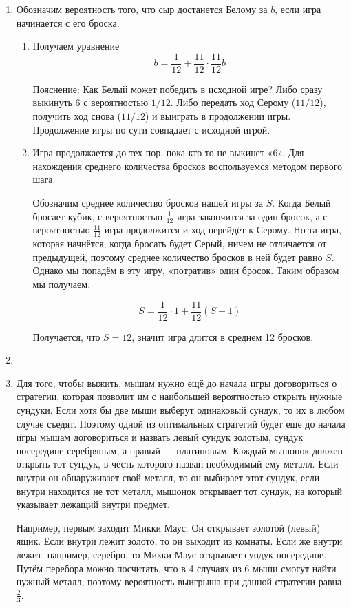 \begin{enumerate}
\item Обозначим вероятность того, что сыр достанется Белому за $b$, если игра
начинается с его броска.

\begin{enumerate}
\item Получаем уравнение
\[
b = \frac{1}{12} + \frac{11}{12} \cdot \frac{11}{12} b
\]

Пояснение: Как Белый может победить в исходной игре? Либо сразу выкинуть 6 с вероятностью $1/12$.
Либо передать ход Серому ($11/12$), получить ход снова ($11/12$) и выиграть в продолжении игры.
Продолжение игры по сути совпадает с исходной игрой.

\item Игра продолжается до тех пор, пока кто-то не выкинет «6».
Для нахождения среднего количества бросков воспользуемся методом первого шага.

Обозначим среднее количество бросков нашей игры за $S$.
Когда Белый бросает кубик, с вероятностью $\frac{1}{12}$ игра закончится за один бросок,
а с вероятностью $\frac{11}{12}$ игра продолжится и ход перейдёт к Серому.
Но та игра, которая начнётся, когда бросать будет Серый, ничем не отличается от предыдущей,
поэтому среднее количество бросков в ней будет равно $S$.
Однако мы попадём в эту игру, «потратив» один бросок. Таким образом мы получаем:

\[
S = \frac{1}{12} \cdot 1 + \frac{11}{12}(S +1)
\]

Получается, что $S = 12$, значит игра длится в среднем 12 бросков.
\end{enumerate}

\item

\item Для того, чтобы выжить, мышам нужно ещё до начала игры договориться о стратегии,
которая позволит им с наибольшей вероятностью открыть нужные сундуки.
Если хотя бы две мыши выберут одинаковый сундук, то их в любом случае съедят.
Поэтому одной из оптимальных стратегий будет ещё до начала игры мышам договориться
и назвать левый сундук золотым, сундук посередине серебряным, а правый — платиновым.
Каждый мышонок должен открыть тот сундук, в честь которого назван необходимый ему металл.
Если внутри он обнаруживает свой металл, то он выбирает этот сундук,
если внутри находится не тот металл, мышонок открывает тот сундук,
на который указывает лежащий внутри предмет.

Например, первым заходит Микки Маус. Он открывает золотой (левый) ящик.
Если внутри лежит золото, то он выходит из комнаты. Если же внутри лежит, например, серебро,
то Микки Маус открывает сундук посередине.
Путём перебора можно посчитать, что в 4 случаях из 6 мыши смогут найти нужный металл,
поэтому вероятность выигрыша при данной стратегии равна $\frac{2}{3}$.


\end{enumerate}
